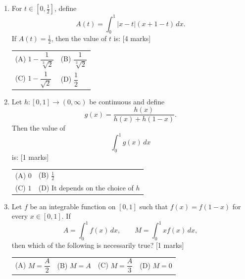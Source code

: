 \documentclass[11pt,a4paper]{article}
\begin{document}
\begin{enumerate}[resume]
{\begin{tabularx}{\linewidth}{X X X X}
\end{tabularx}}
\item For $t\in[0,\tfrac12]$, define
\[
A(t)=\int_0^1 |x-t|(x+1-t)\,dx.
\]
If $A(t)=\tfrac12$, then the value of $t$ is: \hfill [4 marks]
{\renewcommand{\arraystretch}{1.8}
\begin{tabularx}{\linewidth}{X X}
(A) \quad $1-\dfrac{1}{\sqrt[3]{2}}$ & (B) \quad $\dfrac{1}{\sqrt[3]{2}}$ \\[10pt]
(C) \quad $1-\dfrac{1}{\sqrt{2}}$ & (D) \quad $\dfrac12$ \\[10pt]
\end{tabularx}}
\item Let $h:[0,1]\to(0,\infty)$ be continuous and define
\[
g(x)=\frac{h(x)}{h(x)+h(1-x)}.
\]
Then the value of
\[
\int_0^1 g(x)\,dx
\]
is: \hfill [1 marks]
{\renewcommand{\arraystretch}{1.8}
\begin{tabularx}{\linewidth}{X X}
(A) \quad $0$ & (B) \quad $\frac{1}{2}$ \\[10pt]
(C) \quad $1$ & (D) \quad It depends on the choice of $h$ \\[10pt]
\end{tabularx}}
\item Let $f$ be an integrable function on $[0,1]$ such that $f(x)=f(1-x)$ for every $x\in[0,1]$. If
\[
A=\int_0^1 f(x)\,dx,\qquad M=\int_0^1 x f(x)\,dx,
\]
then which of the following is necessarily true? \hfill [1 marks]
{\renewcommand{\arraystretch}{1.8}
\begin{tabularx}{\linewidth}{X X X X}
(A) \quad $M=\dfrac{A}{2}$ & (B) \quad $M=A$ & (C) \quad $M=\dfrac{A}{3}$ & (D) \quad $M=0$ \\[10pt]
\end{tabularx}}
\end{enumerate}
\end{document}
